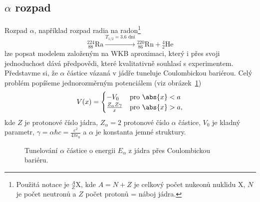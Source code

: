 \subsection{$\alpha$ rozpad}
	Rozpad $\alpha$, například rozpad radia na radon\footnote{
		Použitá notace je ${}^{A}_{Z}\mathrm{X}$, kde $A=N+Z$ je celkový počet nukeonů nuklidu $\mathrm{X}$, $N$ je počet neutronů a $Z$ počet protonů = náboj jádra.
	}
	\begin{equation}
		{}^{224}_{\ 88}\mathrm{Ra}\stackrel{T_{1/2}=3.6\text{ dní}}{\longrightarrow}{}^{220}_{\ 86}\mathrm{Rn}+{}^{4}_{2}\mathrm{He}
	\end{equation}
	lze popsat modelem založeným na WKB aproximaci, který i přes svoji jednoduchost dává předpovědi, které kvalitativně souhlasí s experimentem.
	Představme si, že $\alpha$ částice vázaná v jádře tuneluje Coulombickou bariérou.
	Celý problém popíšeme jednorozměrným potenciálem (viz obrázek~\ref{fig:AlphaDecay})
	\begin{equation}
		V(x)=
			\begin{cases}
				-V_{0} & \text{pro }\abs{x}<a \\
				\frac{Z_{\alpha}Z\gamma}{x} & \text{pro }\abs{x}>a,
			\end{cases}
		\label{eq:AlphaDecayPotential}
	\end{equation}
	kde $Z$ je protonové číslo jádra, $Z_{\alpha}=2$ protonové číslo $\alpha$ částice, $V_{0}$ je kladný parametr,
	$\gamma=\alpha\hbar c=\frac{e^{2}}{4\pi\epsilon_{0}}$ a $\alpha$ je konstanta jemné struktury.

	\begin{figure}[!htbp]
		\centering
		\caption{
			Tunelování $\alpha$ částice o energii $E_{\alpha}$ z jádra přes Coulombickou bariéru.
		}
		\label{fig:AlphaDecay}
	\end{figure}	

